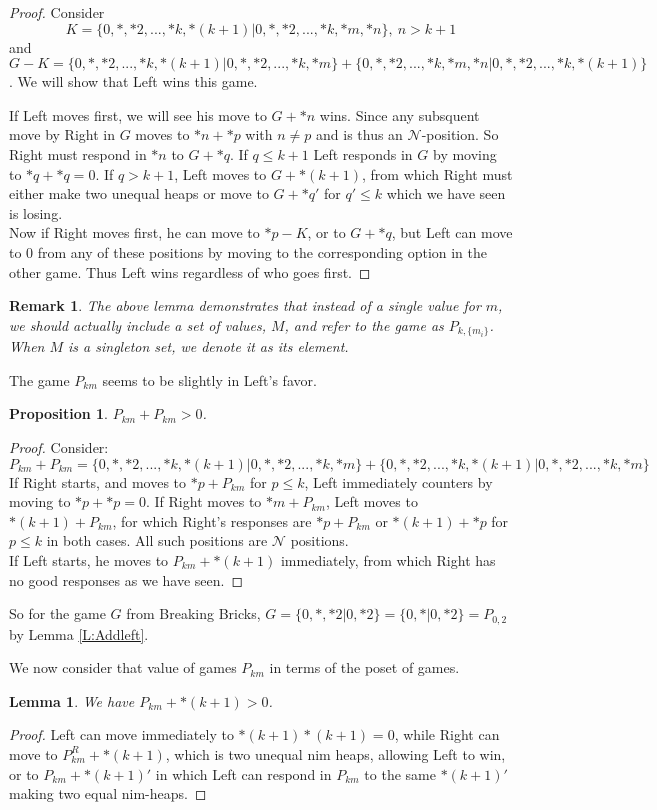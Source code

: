 \documentclass{amsart}
\newtheorem{proposition}[definition]{Proposition}
\newtheorem{lemma}[definition]{Lemma}
\newtheorem{remark}[definition]{Remark}
\begin{document}
\begin{proof}
  Consider
$$K=\{0,*,*2,...,*k,*(k+1)|0,*,*2,...,*k,*m,*n\},\ n>k+1$$
and $G-K=\{0,*,*2,...,*k,*(k+1)|0,*,*2,...,*k,*m\}+\{0,*,*2,...,*k,*m,*n|0,*,*2,...,*k,*(k+1)\}$. We will show that Left wins this game.

If Left moves first, we will see his move to $G+*n$ wins.  Since any subsquent move by Right in $G$ moves to $*n+*p$ with $n\neq p$ and is thus an $\mathcal{N}$-position.  So Right must respond in $*n$ to $G+*q$.  If $q\leq k+1$ Left responds in $G$ by moving to $*q+*q=0$.  If $q>k+1$, Left moves to $G+*(k+1)$, from which Right must either make two unequal heaps or move to $G+*q'$ for $q'\leq k$ which we have seen is losing.\\
Now if Right moves first, he can move to $*p-K$, or to $G+*q$, but Left can move to 0 from any of these positions by moving to the corresponding option in the other game.  Thus Left wins regardless of who goes first.
\end{proof}

\begin{remark}The above lemma demonstrates that instead of a single value for $m$, we should actually include a set of values, $M$, and refer to the game as $P_{k,\{m_i\}}$.  When $M$ is a singleton set, we denote it as its element.
\end{remark}

The game $P_{km}$ seems to be slightly in Left's favor.
\begin{proposition}
$P_{km}+P_{km}>0$.
\end{proposition}
\begin{proof}
Consider:
$$P_{km}+P_{km}=\{0,*,*2,...,*k,*(k+1)|0,*,*2,...,*k,*m\}+\{0,*,*2,...,*k,*(k+1)|0,*,*2,...,*k,*m\}$$
If Right starts, and moves to $*p+P_{km}$ for $p\leq k$, Left immediately counters by moving to $*p+*p=0$.  If Right moves to $*m+P_{km}$, Left moves to $*(k+1)+P_{km}$, for which Right's responses are $*p+P_{km}$ or $*(k+1)+*p$ for $p\leq k$ in both cases.  All such positions are $\mathcal{N}$ positions.\\
If Left starts, he moves to $P_{km}+*(k+1)$ immediately, from which Right has no good responses as we have seen.
\end{proof}

So for the game $G$ from Breaking Bricks,  $G=\{0,*,*2|0,*2\}=\{0,*|0,*2\}=P_{0,2}$ by Lemma \ref{L:Addleft}.


We now consider that value of games $P_{km}$ in terms of the poset of games.
\begin{lemma}
We have $P_{km}+ *(k+1)>0$.
\label{Lemma:k1}
\end{lemma}
\begin{proof}
Left can move immediately to $*(k+1)*(k+1)=0$, while Right can move to $P_{km}^R+*(k+1)$, which is two unequal nim heaps, allowing Left to win, or to $P_{km}+*(k+1)'$ in which Left can respond in $P_{km}$ to the same $*(k+1)'$ making two equal nim-heaps.
\end{proof}
\end{document}
